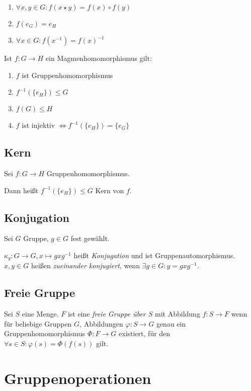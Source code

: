 \begin{enumerate}[label=(\alph*)]
	\item $\forall x, y \in G : f(x \star y) = f(x) \circ f(y)$
	\item $f(e_G) = e_H$
	\item $\forall x \in G : f(x^{-1}) = f(x)^{-1}$
\end{enumerate}

Ist $f : G \rightarrow H$ ein Magmenhomomorphismus gilt:

\begin{enumerate}[label=(\alph*)]
	\item $f$ ist Gruppenhomomorphismus
	\item $f^{-1}(\{e_H\}) \leq G$
	\item $f(G) \leq H$
	\item $f$ ist injektiv $\iff f^{-1}(\{e_H\}) = \{e_G\}$
\end{enumerate}

\subsection*{Kern}

Sei $f : G \rightarrow H$ Gruppenhomomorphismus.

Dann heißt $f^{-1}(\{e_H\}) \leq G$ Kern von $f$.

\subsection*{Konjugation}

Sei $G$ Gruppe, $g \in G$ fest gewählt.

$\kappa_g : G \rightarrow G, x \mapsto gxg^{-1}$ heißt \emph{Konjugation} und ist Gruppenautomorphismus. $x, y \in G$ heißen \emph{zueinander konjugiert}, wenn $\exists g \in G : y = gxg^{-1}$.

\subsection*{Freie Gruppe}

Sei $S$ eine Menge. $F$ ist eine \emph{freie Gruppe über $S$} mit Abbildung $f : S \rightarrow F$ wenn für beliebige Gruppen $G$, Abbildungen $\varphi : S \rightarrow G$ genau ein Gruppenhomomorphismus $\Phi : F \rightarrow G$ existiert, für den $\forall s \in S : \varphi(s) = \Phi(f(s))$ gilt.

\section*{Gruppenoperationen}

